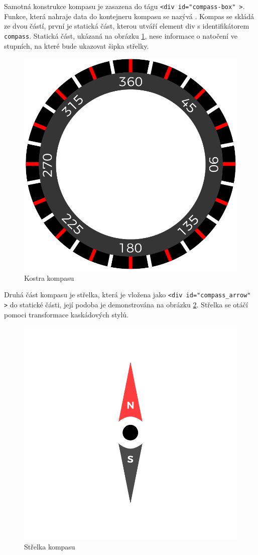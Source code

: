 Samotná konstrukce kompasu je zasazena do tágu \texttt{<div id="compass-box"\,>}. Funkce, která nahraje data do kontejneru kompasu se nazývá \texttt{\createCompass}. Kompas se skládá ze dvou částí, první je statická část, kterou utváří element div s identifikátorem \texttt{compass}. Statická část, ukázaná  na obrázku \ref{img:kompas_kostra}, nese informace o natočení ve stupních, na které bude ukazovat šipka střelky. 


\begin{figure}[h]
	\label{img:kompas_kostra}
	\centering
	\includegraphics[scale=1.0,angle=0,width=0.37\linewidth]{obrazky-figures/kompas_kostra}
	\caption{Kostra kompasu}
\end{figure}

 

Druhá část kompasu je střelka, která je vložena jako \texttt{<div id="compass\_arrow"\,>} do statické části, její podoba je demonstrována na obrázku \ref{img:kompas_strelka}. Střelka se  otáčí pomoci transformace kaskádových stylů.

\begin{figure}[h]
	\label{img:kompas_strelka}
	\centering
	\includegraphics[scale=1.0,angle=0,width=0.4\linewidth]{obrazky-figures/kompas_strelka}
	\caption{Střelka kompasu}
\end{figure}




 


